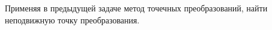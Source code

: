 Применяя в предыдущей задаче метод точечных преобразований,
найти неподвижную точку преобразования.
